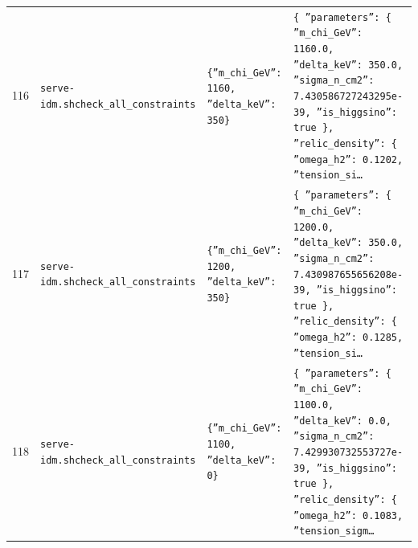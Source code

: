 \documentclass[11pt,a4paper]{article}
\begin{document}
\begin{longtable}{@{}p{}p{}p{}p{}@{}}
116 & \texttt{serve-idm.sh}\newline\texttt{check\_\allowbreak{}all\_\allowbreak{}constraints} & \texttt{\{''m\_\allowbreak{}chi\_\allowbreak{}GeV'':\allowbreak{} 1160,\allowbreak{} ''delta\_\allowbreak{}keV'':\allowbreak{} 350\}\allowbreak{}} & \texttt{\{   ''parameters'':\allowbreak{} \{     ''m\_\allowbreak{}chi\_\allowbreak{}GeV'':\allowbreak{} 1160.0,\allowbreak{}     ''delta\_\allowbreak{}keV'':\allowbreak{} 350.0,\allowbreak{}     ''sigma\_\allowbreak{}n\_\allowbreak{}cm2'':\allowbreak{} 7.430586727243295e-39,\allowbreak{}     ''is\_\allowbreak{}higgsino'':\allowbreak{} true   \}\allowbreak{},\allowbreak{}   ''relic\_\allowbreak{}density'':\allowbreak{} \{     ''omega\_\allowbreak{}h2'':\allowbreak{} 0.1202,\allowbreak{}     ''tension\_\allowbreak{}si\ldots{}\allowbreak{}} \\
117 & \texttt{serve-idm.sh}\newline\texttt{check\_\allowbreak{}all\_\allowbreak{}constraints} & \texttt{\{''m\_\allowbreak{}chi\_\allowbreak{}GeV'':\allowbreak{} 1200,\allowbreak{} ''delta\_\allowbreak{}keV'':\allowbreak{} 350\}\allowbreak{}} & \texttt{\{   ''parameters'':\allowbreak{} \{     ''m\_\allowbreak{}chi\_\allowbreak{}GeV'':\allowbreak{} 1200.0,\allowbreak{}     ''delta\_\allowbreak{}keV'':\allowbreak{} 350.0,\allowbreak{}     ''sigma\_\allowbreak{}n\_\allowbreak{}cm2'':\allowbreak{} 7.430987655656208e-39,\allowbreak{}     ''is\_\allowbreak{}higgsino'':\allowbreak{} true   \}\allowbreak{},\allowbreak{}   ''relic\_\allowbreak{}density'':\allowbreak{} \{     ''omega\_\allowbreak{}h2'':\allowbreak{} 0.1285,\allowbreak{}     ''tension\_\allowbreak{}si\ldots{}\allowbreak{}} \\
118 & \texttt{serve-idm.sh}\newline\texttt{check\_\allowbreak{}all\_\allowbreak{}constraints} & \texttt{\{''m\_\allowbreak{}chi\_\allowbreak{}GeV'':\allowbreak{} 1100,\allowbreak{} ''delta\_\allowbreak{}keV'':\allowbreak{} 0\}\allowbreak{}} & \texttt{\{   ''parameters'':\allowbreak{} \{     ''m\_\allowbreak{}chi\_\allowbreak{}GeV'':\allowbreak{} 1100.0,\allowbreak{}     ''delta\_\allowbreak{}keV'':\allowbreak{} 0.0,\allowbreak{}     ''sigma\_\allowbreak{}n\_\allowbreak{}cm2'':\allowbreak{} 7.429930732553727e-39,\allowbreak{}     ''is\_\allowbreak{}higgsino'':\allowbreak{} true   \}\allowbreak{},\allowbreak{}   ''relic\_\allowbreak{}density'':\allowbreak{} \{     ''omega\_\allowbreak{}h2'':\allowbreak{} 0.1083,\allowbreak{}     ''tension\_\allowbreak{}sigm\ldots{}\allowbreak{}} \\

\end{longtable}
\end{document}
